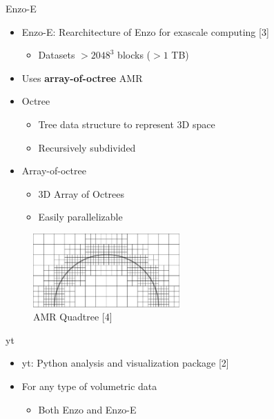 \documentclass[
  ignorenonframetext,
]{beamer}
\providecommand{\tightlist}{%
  \setlength{\itemsep}{0pt}\setlength{\parskip}{0pt}}
\begin{document}
\begin{frame}{Enzo-E}
\protect\hypertarget{enzo-e}{}
\begin{itemize}
\tightlist
\item
  Enzo-E: Rearchitecture of Enzo for exascale computing {[}3{]}

  \begin{itemize}
  \tightlist
  \item
    Datasets \(>2048^3\) blocks (\(>1\) TB)
  \end{itemize}
\item
  Uses \textbf{array-of-octree} AMR
\item
  Octree

  \begin{itemize}
  \tightlist
  \item
    Tree data structure to represent 3D space
  \item
    Recursively subdivided
  \end{itemize}
\item
  Array-of-octree

  \begin{itemize}
  \tightlist
  \item
    3D Array of Octrees
  \item
    Easily parallelizable
  \end{itemize}
\end{itemize}

\begin{figure}
\centering
\includegraphics[width=0.5\textwidth,height=0.5\textheight]{block_amr.png}
\caption{AMR Quadtree {[}4{]}}
\end{figure}
\end{frame}

\begin{frame}{yt}
\protect\hypertarget{yt}{}
\begin{itemize}
\tightlist
\item
  yt: Python analysis and visualization package {[}2{]}
\item
  For any type of volumetric data

  \begin{itemize}
  \tightlist
  \item
    Both Enzo and Enzo-E
  \end{itemize}
\end{itemize}
\end{frame}
\end{document}
